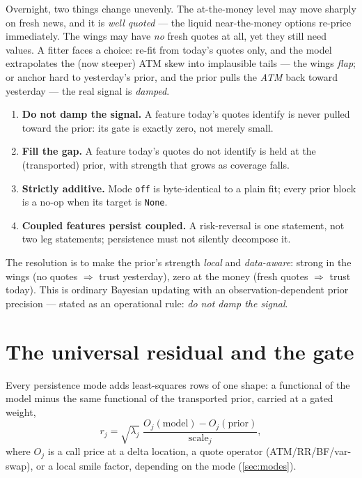 \documentclass[11pt]{article}
\begin{document}
Overnight, two things change unevenly. The at-the-money level may move sharply
on fresh news, and it is \emph{well quoted} --- the liquid near-the-money
options re-price immediately. The wings may have \emph{no} fresh quotes at
all, yet they still need values. A fitter faces a choice: re-fit from today's
quotes only, and the model extrapolates the (now steeper) ATM skew into
implausible tails --- the wings \emph{flap}; or anchor hard to yesterday's
prior, and the prior pulls the \emph{ATM} back toward yesterday --- the real
signal is \emph{damped}.

\begin{invariant}
\begin{enumerate}[leftmargin=1.6em]
\item \textbf{Do not damp the signal.} A feature today's quotes identify is
never pulled toward the prior: its gate is exactly zero, not merely small.
\item \textbf{Fill the gap.} A feature today's quotes do not identify is held
at the (transported) prior, with strength that grows as coverage falls.
\item \textbf{Strictly additive.} Mode \texttt{off} is byte-identical to a
plain fit; every prior block is a no-op when its target is \texttt{None}.
\item \textbf{Coupled features persist coupled.} A risk-reversal is one
statement, not two leg statements; persistence must not silently decompose it.
\end{enumerate}
\end{invariant}

\begin{heuristic}
The resolution is to make the prior's strength \emph{local} and
\emph{data-aware}: strong in the wings (no quotes $\Rightarrow$ trust
yesterday), zero at the money (fresh quotes $\Rightarrow$ trust today). This
is ordinary Bayesian updating with an observation-dependent prior precision
--- stated as an operational rule: \emph{do not damp the signal}.
\end{heuristic}

\section{The universal residual and the gate}
\label{sec:gate}

Every persistence mode adds least-squares rows of one shape: a functional of
the model minus the same functional of the transported prior, carried at a
gated weight,
\begin{equation}
\boxed{\;r_j=\sqrt{\lambda_j}\;
\frac{O_j(\text{model})-O_j(\text{prior})}{\text{scale}_j},\;}
\label{eq:universal}
\end{equation}
where $O_j$ is a call price at a delta location, a quote operator
(ATM/RR/BF/var-swap), or a local smile factor, depending on the mode
(\cref{sec:modes}).
\end{document}
